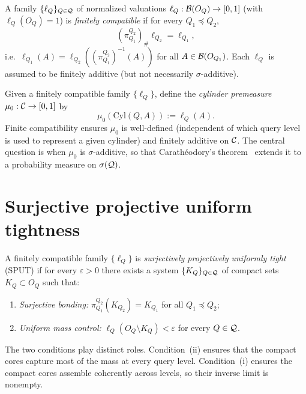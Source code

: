 \begin{definition}
A family $\{\ell_Q\}_{Q \in \mathcal{Q}}$ of normalized valuations
$\ell_Q : \mathcal{B}(O_Q) \to [0,1]$ (with $\ell_Q(O_Q) = 1$) is
\emph{finitely compatible} if for every $Q_1 \preceq Q_2$,
\[
(\pi^{Q_2}_{Q_1})_\# \ell_{Q_2} = \ell_{Q_1},
\]
i.e.\ $\ell_{Q_1}(A) = \ell_{Q_2}((\pi^{Q_2}_{Q_1})^{-1}(A))$ for
all $A \in \mathcal{B}(O_{Q_1})$.  Each $\ell_Q$ is assumed to be
finitely additive (but not necessarily $\sigma$-additive).
\end{definition}

\begin{remark}
Given a finitely compatible family $\{\ell_Q\}$, define the
\emph{cylinder premeasure} $\mu_0 : \mathcal{C} \to [0,1]$ by
\[
\mu_0(\mathrm{Cyl}(Q, A)) := \ell_Q(A).
\]
Finite compatibility ensures $\mu_0$ is well-defined (independent of
which query level is used to represent a given cylinder) and
finitely additive on $\mathcal{C}$.  The central question is when $\mu_0$
is $\sigma$-additive, so that Carath\'eodory's theorem~\cite{Billingsley1995,Bogachev2007} extends it
to a probability measure on $\sigma(\mathcal{Q})$.
\end{remark}

\section{Surjective projective uniform tightness}\label{sec:sput}

\begin{definition}
\label{def:sput}
A finitely compatible family $\{\ell_Q\}$ is \emph{surjectively
projectively uniformly tight} (SPUT) if for every $\varepsilon > 0$
there exists a system $\{K_Q\}_{Q \in \mathcal{Q}}$ of compact sets
$K_Q \subset O_Q$ such that:
\begin{enumerate}[label=(\roman*)]
\item \emph{Surjective bonding:}
  $\pi^{Q_2}_{Q_1}(K_{Q_2}) = K_{Q_1}$ for all $Q_1 \preceq Q_2$;
\item \emph{Uniform mass control:}
  $\ell_Q(O_Q \setminus K_Q) < \varepsilon$ for every $Q \in \mathcal{Q}$.
\end{enumerate}
\end{definition}

The two conditions play distinct roles.  Condition~(ii) ensures that
the compact cores capture most of the mass at every query level.
Condition~(i) ensures the compact cores assemble coherently across
levels, so their inverse limit is nonempty.

